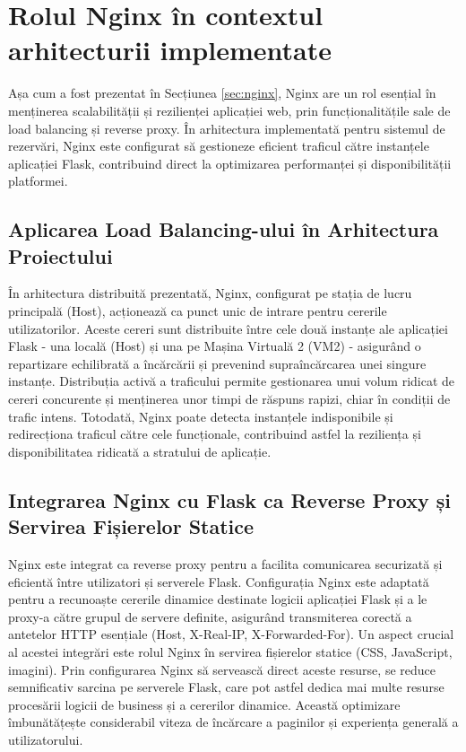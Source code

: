 \documentclass[12pt, a4paper, oneside, romanian]{teza-upb}
\begin{document}
\section{Rolul Nginx în contextul arhitecturii implementate}
Așa cum a fost prezentat în Secțiunea \ref{sec:nginx}, Nginx are un rol esențial în menținerea scalabilității și rezilienței aplicației web, prin funcționalitățile sale de load balancing și reverse proxy. În arhitectura implementată pentru sistemul de rezervări, Nginx este configurat să gestioneze eficient traficul către instanțele aplicației Flask, contribuind direct la optimizarea performanței și disponibilității platformei.



\subsection*{Aplicarea Load Balancing-ului în Arhitectura Proiectului}
În arhitectura distribuită prezentată, Nginx, configurat pe stația de lucru principală (Host), acționează ca punct unic de intrare pentru cererile utilizatorilor. Aceste cereri sunt distribuite între cele două instanțe ale aplicației Flask - una locală (Host) și una pe Mașina Virtuală 2 (VM2) - asigurând o repartizare echilibrată a încărcării și prevenind supraîncărcarea unei singure instanțe. Distribuția activă a traficului permite gestionarea unui volum ridicat de cereri concurente și menținerea unor timpi de răspuns rapizi, chiar în condiții de trafic intens. Totodată, Nginx poate detecta instanțele indisponibile și redirecționa traficul către cele funcționale, contribuind astfel la reziliența și disponibilitatea ridicată a stratului de aplicație.

\subsection*{Integrarea Nginx cu Flask ca Reverse Proxy și Servirea Fișierelor Statice}
Nginx este integrat ca reverse proxy pentru a facilita comunicarea securizată și eficientă între utilizatori și serverele Flask. Configurația Nginx este adaptată pentru a recunoaște cererile dinamice destinate logicii aplicației Flask și a le proxy-a către grupul de servere definite, asigurând transmiterea corectă a antetelor HTTP esențiale (Host, X-Real-IP, X-Forwarded-For). Un aspect crucial al acestei integrări este rolul Nginx în servirea fișierelor statice (CSS, JavaScript, imagini). Prin configurarea Nginx să servească direct aceste resurse, se reduce semnificativ sarcina pe serverele Flask, care pot astfel dedica mai multe resurse procesării logicii de business și a cererilor dinamice. Această optimizare îmbunătățește considerabil viteza de încărcare a paginilor și experiența generală a utilizatorului.
\end{document}
